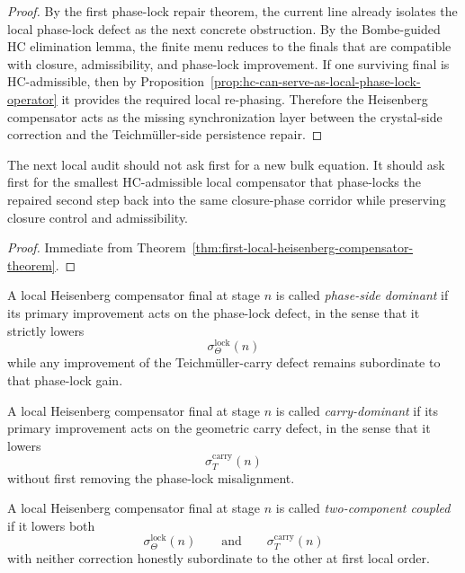\begin{proof}
By the first phase-lock repair theorem, the current line already isolates the local phase-lock defect as the next concrete obstruction. By the Bombe-guided HC elimination lemma, the finite menu reduces to the finals that are compatible with closure, admissibility, and phase-lock improvement. If one surviving final is HC-admissible, then by Proposition~\ref{prop:hc-can-serve-as-local-phase-lock-operator} it provides the required local re-phasing. Therefore the Heisenberg compensator acts as the missing synchronization layer between the crystal-side correction and the Teichm\"uller-side persistence repair.
\end{proof}

\begin{corollary}
\label{cor:current-hc-working-rule}
The next local audit should not ask first for a new bulk equation. It should ask first for the smallest HC-admissible local compensator that phase-locks the repaired second step back into the same closure-phase corridor while preserving closure control and admissibility.
\end{corollary}

\begin{proof}
Immediate from Theorem~\ref{thm:first-local-heisenberg-compensator-theorem}.
\end{proof}



\begin{definition}
\label{def:phase-side-dominant-hc-final}
A local Heisenberg compensator final at stage $n$ is called \emph{phase-side dominant} if its primary improvement acts on the phase-lock defect, in the sense that it strictly lowers
\[
 \sigma_{\Theta}^{\mathrm{lock}}(n)
\]
while any improvement of the Teichm\"uller-carry defect remains subordinate to that phase-lock gain.
\end{definition}

\begin{definition}
\label{def:carry-dominant-hc-final}
A local Heisenberg compensator final at stage $n$ is called \emph{carry-dominant} if its primary improvement acts on the geometric carry defect, in the sense that it lowers
\[
 \sigma_T^{\mathrm{carry}}(n)
\]
without first removing the phase-lock misalignment.
\end{definition}

\begin{definition}
\label{def:two-component-hc-final}
A local Heisenberg compensator final at stage $n$ is called \emph{two-component coupled} if it lowers both
\[
 \sigma_{\Theta}^{\mathrm{lock}}(n)
 \qquad\text{and}\qquad
 \sigma_T^{\mathrm{carry}}(n)
\]
with neither correction honestly subordinate to the other at first local order.
\end{definition}

